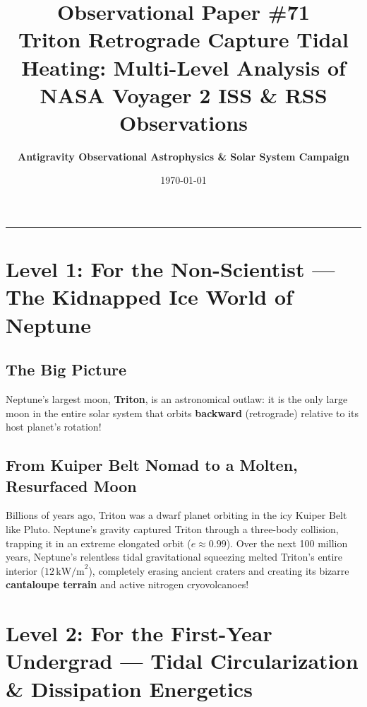\documentclass[11pt,a4paper]{article}
\title{\Huge \textbf{Observational Paper \#71}\\ \Large Triton Retrograde Capture Tidal Heating: Multi-Level Analysis of NASA Voyager 2 ISS \& RSS Observations}
\author{\textbf{Antigravity Observational Astrophysics \& Solar System Campaign}}
\date{\today}
\begin{document}
\maketitle

\vspace{-1em}
\begin{center}
\rule{\textwidth}{1.5pt}
\end{center}

\section*{Level 1: For the Non-Scientist — The Kidnapped Ice World of Neptune}

\subsection*{The Big Picture}
Neptune's largest moon, \textbf{Triton}, is an astronomical outlaw: it is the only large moon in the entire solar system that orbits \textbf{backward} (retrograde) relative to its host planet's rotation!

\subsection*{From Kuiper Belt Nomad to a Molten, Resurfaced Moon}
Billions of years ago, Triton was a dwarf planet orbiting in the icy Kuiper Belt like Pluto. Neptune's gravity captured Triton through a three-body collision, trapping it in an extreme elongated orbit ($e \approx 0.99$). Over the next 100 million years, Neptune's relentless tidal gravitational squeezing melted Triton's entire interior ($12\,\text{kW/m}^2$), completely erasing ancient craters and creating its bizarre \textbf{cantaloupe terrain} and active nitrogen cryovolcanoes!

\newpage

\section*{Level 2: For the First-Year Undergrad — Tidal Circularization \& Dissipation Energetics}
\end{document}
